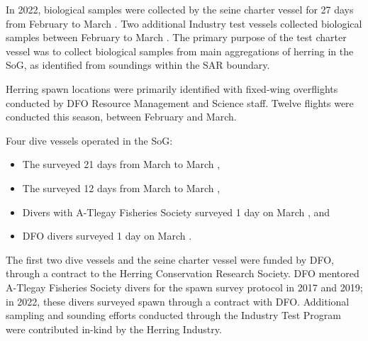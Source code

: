In 2022, biological samples were collected by the seine charter vessel
 for 27 days from February  to March .
Two additional Industry test vessels collected biological samples
between February  to March .
The primary purpose of the test charter vessel was to
collect biological samples from main aggregations of herring in the SoG,
as identified from soundings within the SAR boundary.

Herring spawn locations were primarily identified with fixed-wing overflights
conducted by DFO Resource Management and Science staff.
Twelve flights were conducted this season, between February and March.

Four dive vessels operated in the SoG:

\begin{itemize}

\item The  surveyed 21 days from March  to March ,

\item The  surveyed 12 days from March  to March ,

\item Divers with A-Tlegay Fisheries Society surveyed 1 day on March , and

\item DFO divers surveyed 1 day on March .

\end{itemize}

The first two dive vessels and the seine charter vessel  were funded by DFO,
through a contract to the Herring Conservation Research Society.
DFO mentored A-Tlegay Fisheries Society divers for the spawn survey protocol in 2017 and 2019;
in 2022, these divers surveyed spawn through a contract with DFO.
Additional sampling and sounding efforts conducted through the
Industry Test Program were contributed in-kind by the Herring Industry.
